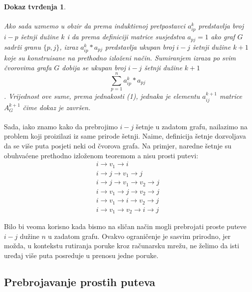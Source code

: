 \documentclass[11pt]{article}
\newtheorem*{custom_proof}{Dokaz tvrđenja}
\begin{document}
\begin{custom_proof}
			\paragraph{}
			Ako sada uzmemo u obzir da prema induktivnoj pretpostavci $a_{ip}^k$ predstavlja broj $i-p$ šetnji dužine $k$ i da prema definiciji matrice susjedstva $a_{pj}=1$ ako graf $G$ sadrži granu $\{p,j\}$, 
			izraz $a_{ip}^k * a_{pj}$ predstavlja ukupan broj $i-j$ šetnji dužine $k+1$ koje su konstruisane na prethodno izloženi način. 
			Sumiranjem izraza po svim čvorovima grafa $G$ dobija se ukupan broj $i-j$ šetnji dužine $k+1$ 
			\[ \sum_{p=1}^{n} a_{ip}^k * a_{pj} \]. 
			Vrijednost ove sume, prema jednakosti (1), jednaka je elementu $a_{ij}^{k+1}$ matrice $A_G^{k+1}$ čime dokaz je završen.
		\end{custom_proof}
	
		\paragraph{}
		Sada, iako znamo kako da prebrojimo $i-j$ šetnje u zadatom grafu, nailazimo na problem koji proizilazi iz same prirode šetnji. Naime, definicija šetnje dozvoljava da se više puta posjeti neki od čvorova grafa.
		Na primjer, naredne šetnje su obuhvaćene prethodno izloženom teoremom a nisu prosti putevi:
		\[
			\begin{split}
			i \rightarrow v_1 \rightarrow i \\
			i \rightarrow  j \rightarrow v_1 \rightarrow j \\
			i \rightarrow j \rightarrow v_1 \rightarrow v_2 \rightarrow j \\
			i \rightarrow v_1 \rightarrow j \rightarrow v_2 \rightarrow j \\
			i \rightarrow v_1 \rightarrow i \rightarrow v_2 \rightarrow j \\
			i \rightarrow v_1 \rightarrow v_2 \rightarrow i \rightarrow j 
			\end{split}
		\]

		Bilo bi veoma korisno kada bismo na sličan način mogli prebrojati proste puteve $i-j$ dužine $n$ u zadatom grafu. 
		Ovakvo ograničenje je sasvim prirodno, jer možda, u kontekstu rutiranja poruke kroz računarsku mrežu,
		ne želimo da isti uređaj više puta posreduje u prenosu jedne poruke. 
		
		\subsection{Prebrojavanje prostih puteva}
\end{document}
